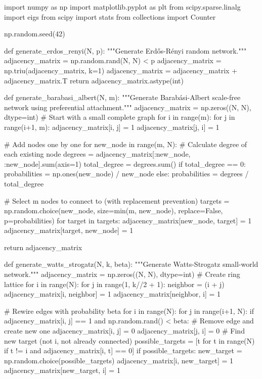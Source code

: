 \documentclass[a4paper, 11pt]{article}
\begin{document}
\begin{pycode}
import numpy as np
import matplotlib.pyplot as plt
from scipy.sparse.linalg import eigs
from scipy import stats
from collections import Counter

np.random.seed(42)

def generate_erdos_renyi(N, p):
    """Generate Erdős-Rényi random network."""
    adjacency_matrix = np.random.rand(N, N) < p
    adjacency_matrix = np.triu(adjacency_matrix, k=1)
    adjacency_matrix = adjacency_matrix + adjacency_matrix.T
    return adjacency_matrix.astype(int)

def generate_barabasi_albert(N, m):
    """Generate Barabási-Albert scale-free network using preferential attachment."""
    adjacency_matrix = np.zeros((N, N), dtype=int)
    # Start with a small complete graph
    for i in range(m):
        for j in range(i+1, m):
            adjacency_matrix[i, j] = 1
            adjacency_matrix[j, i] = 1

    # Add nodes one by one
    for new_node in range(m, N):
        # Calculate degree of each existing node
        degrees = adjacency_matrix[:new_node, :new_node].sum(axis=1)
        total_degree = degrees.sum()
        if total_degree == 0:
            probabilities = np.ones(new_node) / new_node
        else:
            probabilities = degrees / total_degree

        # Select m nodes to connect to (with replacement prevention)
        targets = np.random.choice(new_node, size=min(m, new_node), replace=False, p=probabilities)
        for target in targets:
            adjacency_matrix[new_node, target] = 1
            adjacency_matrix[target, new_node] = 1

    return adjacency_matrix

def generate_watts_strogatz(N, k, beta):
    """Generate Watts-Strogatz small-world network."""
    adjacency_matrix = np.zeros((N, N), dtype=int)
    # Create ring lattice
    for i in range(N):
        for j in range(1, k//2 + 1):
            neighbor = (i + j) %
            adjacency_matrix[i, neighbor] = 1
            adjacency_matrix[neighbor, i] = 1

    # Rewire edges with probability beta
    for i in range(N):
        for j in range(i+1, N):
            if adjacency_matrix[i, j] == 1 and np.random.rand() < beta:
                # Remove edge and create new one
                adjacency_matrix[i, j] = 0
                adjacency_matrix[j, i] = 0
                # Find new target (not i, not already connected)
                possible_targets = [t for t in range(N) if t != i and adjacency_matrix[i, t] == 0]
                if possible_targets:
                    new_target = np.random.choice(possible_targets)
                    adjacency_matrix[i, new_target] = 1
                    adjacency_matrix[new_target, i] = 1


\end{pycode}
\end{document}
